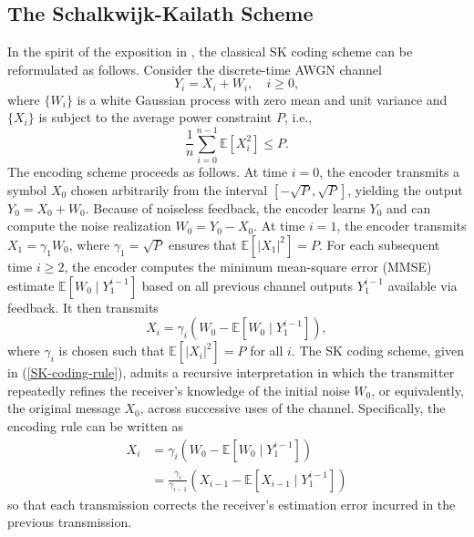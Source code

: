 \documentclass[12pt]{article}
\newcommand{\E}{\mathbb{E}}
\begin{document}
\subsection{The Schalkwijk-Kailath Scheme}\label{sec:the_classical_schalkwijk_kailath_coding}
In the spirit of the exposition in \cite[Section 17.1.1]{el2011network}, the classical SK coding scheme can be reformulated as follows. Consider the discrete-time AWGN channel
\begin{equation}\label{AWGN-channel}
Y_i=X_i+W_i,\quad i \ge 0,
\end{equation}
where $\{W_i\}$ is a white Gaussian process with zero mean and unit variance and $\{X_i\}$ is subject to the average power constraint $P$, i.e., 
$$
\frac{1}{n}\sum_{i=0}^{n-1}\E[X_i^2]\le  P.
$$
The encoding scheme proceeds as follows. At time $i=0$,  the encoder transmits a symbol $X_0$ chosen arbitrarily from the interval $[-\sqrt{P},\sqrt{P}]$,  yielding the output $Y_0 = X_0+W_0$. Because of noiseless feedback, the encoder learns $Y_0$ and can compute the noise realization $W_0 = Y_0 - X_0$. At time $i=1$, the encoder transmits $X_1 = \gamma_1W_0$, where $\gamma_1=\sqrt{P}$ ensures that $\E[|X_1|^2] =P$. For each subsequent time $i\ge 2$, the encoder computes the minimum mean-square error (MMSE) estimate $\E[W_0\mid Y_1^{i-1}]$ based on all previous channel outputs $Y_1^{i-1}$ available via feedback. It then transmits 
\begin{equation}\label{SK-coding-rule}
X_i = \gamma_i (W_0 - \E[W_0\mid Y_1^{i-1}]),
\end{equation}
where $\gamma_i$ is chosen such that $\E[|X_i|^2] = P$ for all $i$. The SK coding scheme, given in (\ref{SK-coding-rule}), admits a recursive interpretation in which the transmitter repeatedly refines the receiver's knowledge of the initial noise $W_0$, or equivalently, the original message $X_0$, across successive uses of the channel. Specifically, the encoding rule can be written as
\begin{equation*}
\begin{aligned}
X_i &=  \gamma_i (W_0 - \E[W_0\mid Y_1^{i-1}])\\
&= \frac{\gamma_i}{\gamma_{i-1}} \left(X_{i-1} -\E[X_{i-1}\mid Y_1^{i-1}]\right)
\end{aligned}
\end{equation*}
so that each transmission corrects the receiver's estimation error incurred in the previous transmission. 
\end{document}
